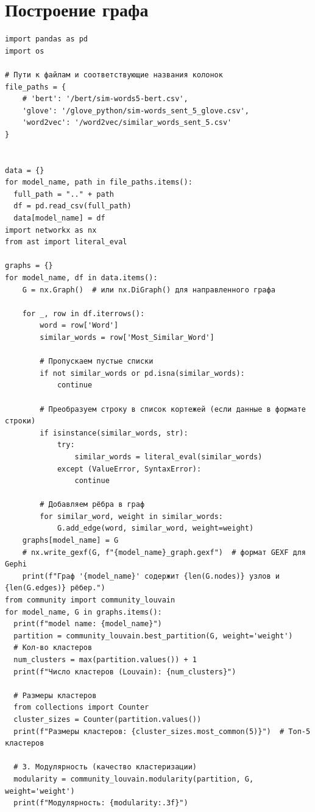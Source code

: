 \documentclass[coursework]{SCWorks}
\begin{document}
\section{Построение графа}
\label{apx:graph}
\begin{verbatim}
import pandas as pd
import os

# Пути к файлам и соответствующие названия колонок
file_paths = {
    # 'bert': '/bert/sim-words5-bert.csv',
    'glove': '/glove_python/sim-words_sent_5_glove.csv',
    'word2vec': '/word2vec/similar_words_sent_5.csv'
}


data = {}
for model_name, path in file_paths.items():
  full_path = ".." + path
  df = pd.read_csv(full_path)
  data[model_name] = df
import networkx as nx
from ast import literal_eval

graphs = {}
for model_name, df in data.items():
    G = nx.Graph()  # или nx.DiGraph() для направленного графа
    
    for _, row in df.iterrows():
        word = row['Word']
        similar_words = row['Most_Similar_Word']
        
        # Пропускаем пустые списки
        if not similar_words or pd.isna(similar_words):
            continue
        
        # Преобразуем строку в список кортежей (если данные в формате строки)
        if isinstance(similar_words, str):
            try:
                similar_words = literal_eval(similar_words)
            except (ValueError, SyntaxError):
                continue
        
        # Добавляем рёбра в граф
        for similar_word, weight in similar_words:
            G.add_edge(word, similar_word, weight=weight)
    graphs[model_name] = G    
    # nx.write_gexf(G, f"{model_name}_graph.gexf")  # формат GEXF для Gephi
    print(f"Граф '{model_name}' содержит {len(G.nodes)} узлов и {len(G.edges)} рёбер.")
from community import community_louvain
for model_name, G in graphs.items():
  print(f"model name: {model_name}")
  partition = community_louvain.best_partition(G, weight='weight')
  # Кол-во кластеров
  num_clusters = max(partition.values()) + 1
  print(f"Число кластеров (Louvain): {num_clusters}")
  
  # Размеры кластеров
  from collections import Counter
  cluster_sizes = Counter(partition.values())
  print(f"Размеры кластеров: {cluster_sizes.most_common(5)}")  # Топ-5 кластеров

  # 3. Модулярность (качество кластеризации)
  modularity = community_louvain.modularity(partition, G, weight='weight')
  print(f"Модулярность: {modularity:.3f}")
\end{verbatim}
\end{document}
